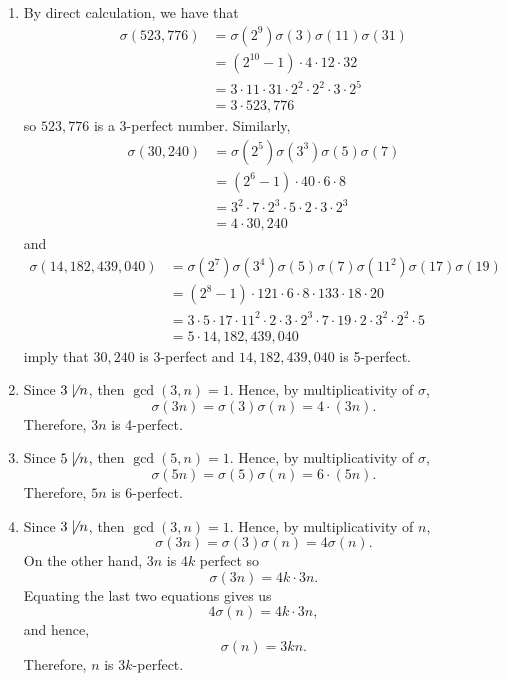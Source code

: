 \begin{solution}
    \begin{enumerate}
        \item By direct calculation, we have that
        \begin{align*}
            \sigma(523,776) &= \sigma(2^9)\sigma(3)\sigma(11)\sigma(31) \\
            &= (2^{10} - 1)\cdot 4 \cdot 12 \cdot 32 \\
            &= 3\cdot 11\cdot 31 \cdot 2^2 \cdot 2^2 \cdot 3 \cdot 2^5 \\
            &= 3 \cdot 523,776
        \end{align*}
        so $523,776$ is a 3-perfect number. Similarly,
        \begin{align*}
            \sigma(30,240) &= \sigma(2^5)\sigma(3^3)\sigma(5) \sigma(7) \\
            &= (2^6 - 1)\cdot 40 \cdot 6 \cdot 8 \\
            &= 3^2 \cdot 7 \cdot 2^3 \cdot 5 \cdot 2\cdot 3 \cdot 2^3 \\
            &= 4\cdot 30,240
        \end{align*}
        and 
        \begin{align*}
            \sigma(14,182,439,040) &= \sigma(2^7)\sigma(3^4)\sigma(5)\sigma(7)\sigma(11^2)\sigma(17)\sigma(19) \\
            &= (2^8 - 1)\cdot 121\cdot 6 \cdot 8 \cdot 133\cdot 18 \cdot 20 \\
            &= 3\cdot5 \cdot 17 \cdot 11^2 \cdot 2\cdot 3 \cdot 2^3 \cdot 7 \cdot 19 \cdot 2 \cdot 3^2 \cdot 2^2 \cdot 5 \\
            &= 5 \cdot 14,182,439,040
        \end{align*}
        imply that $30,240$ is 3-perfect and $14,182,439,040$ is 5-perfect.
        \item Since $3 \not\mid n$, then $\gcd(3,n) = 1$. Hence, by multiplicativity of $\sigma$,
        $$\sigma(3n) = \sigma(3)\sigma(n) = 4\cdot (3n).$$
        Therefore, $3n$ is 4-perfect.
        \item Since $5 \not\mid n$, then $\gcd(5,n) = 1$. Hence, by multiplicativity of $\sigma$,
        $$\sigma(5n) = \sigma(5)\sigma(n) = 6\cdot (5n).$$
        Therefore, $5n$ is 6-perfect.
        \item Since $3 \not\mid n$, then $\gcd(3,n) = 1$. Hence, by multiplicativity of $n$,
        $$\sigma(3n) = \sigma(3)\sigma(n) = 4\sigma(n).$$
        On the other hand, $3n$ is $4k$ perfect so
        $$\sigma(3n) = 4k \cdot 3n.$$
        Equating the last two equations gives us
        $$4 \sigma(n) = 4k\cdot 3n,$$
        and hence, 
        $$\sigma(n) = 3kn.$$
        Therefore, $n$ is $3k$-perfect. \\
    \end{enumerate}
\end{solution}

